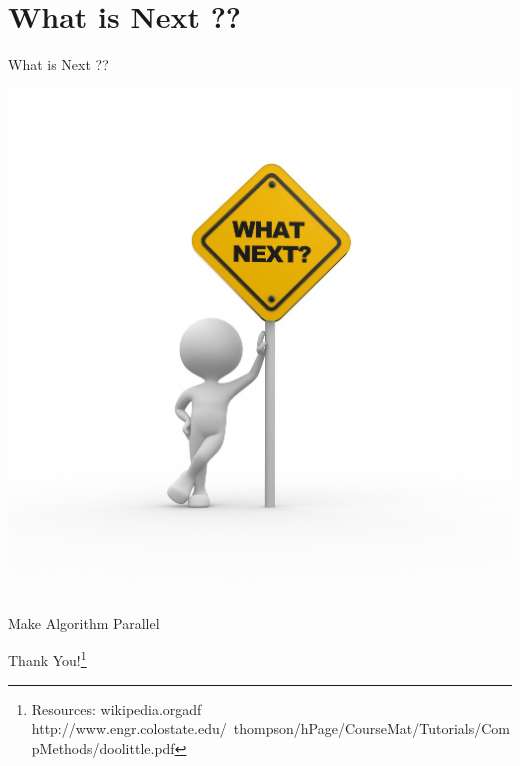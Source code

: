 \documentclass{beamer}
\begin{document}
\section{What is Next ??}
\begin{frame}{What is Next ??}
\begin{center}
\includegraphics[scale=.2]{pic3.jpg}
\end{center}
\end{frame}
\begin{frame}
\begin{center}
\begin{huge}
Make Algorithm Parallel\\
\end{huge}
Thank You!\footnote{Resources: wikipedia.orgadf\\http://www.engr.colostate.edu/~thompson/hPage/CourseMat/Tutorials/CompMethods/doolittle.pdf}
\end{center}
\end{frame}
\end{document}
